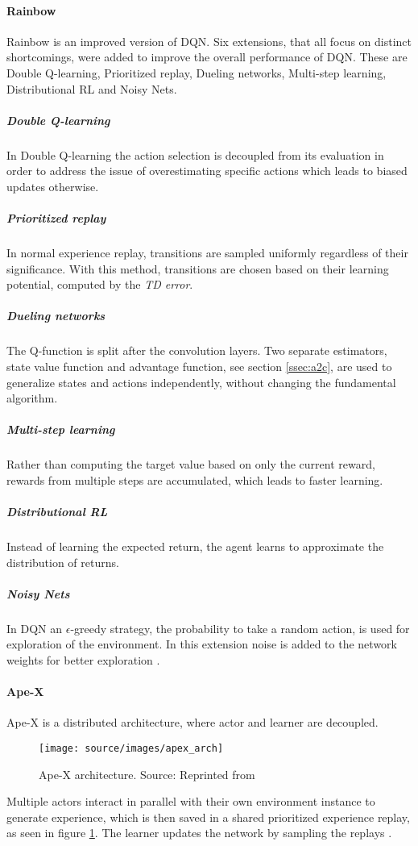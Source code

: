 \paragraph{Rainbow} \label{ssec:rain}
Rainbow is an improved version of DQN. Six extensions, that all focus on distinct shortcomings, were added to improve the overall performance of DQN. These are Double Q-learning, Prioritized replay, Dueling networks, Multi-step learning, Distributional RL and Noisy Nets.
\subparagraph{Double Q-learning}
In Double Q-learning the action selection is decoupled from its evaluation in order to address the issue of overestimating specific actions which leads to biased updates otherwise.
\subparagraph{Prioritized replay}
In normal experience replay, transitions are sampled uniformly regardless of their significance. With this method, transitions are chosen based on their learning potential, computed by the \textit{TD error}.
\subparagraph{Dueling networks}
The Q-function is split after the convolution layers. Two separate estimators, state value function and advantage function, see section \ref{ssec:a2c}, are used to generalize states and actions independently, without changing the fundamental algorithm.
\subparagraph{Multi-step learning}
Rather than computing the target value based on only the current reward, rewards from multiple steps are accumulated, which leads to faster learning.
\subparagraph{Distributional RL}
Instead of learning the expected return, the agent learns to approximate the distribution of returns.
\subparagraph{Noisy Nets}
In DQN an \(\epsilon\)-greedy strategy, the probability to take a random action, is used for exploration of the environment. In this extension noise is added to the network weights for better exploration \cite{2017arXiv171002298H}.

\paragraph{Ape-X} \label{ssec:apex}
Ape-X is a distributed architecture, where actor and learner are decoupled. 
\begin{figure}[H]%
\centering
\texttt{[image: source/images/apex\_arch]}%
\caption[Ape-X architecture]{Ape-X architecture. Source: Reprinted from \protect\cite{2018arXiv180300933H}}%
\label{fig:apex_arch}%
\end{figure}
Multiple actors interact in parallel with their own environment instance to generate experience, which is then saved in a shared prioritized experience replay, as seen in figure \ref{fig:apex_arch}. The learner updates the network by sampling the replays \cite{2018arXiv180300933H}.

